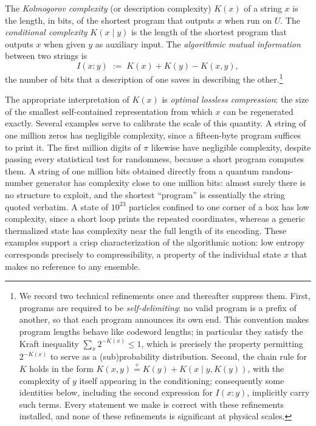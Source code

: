 \documentclass[11pt]{article}
\newcommand{\peq}{\mathrel{\stackrel{+}{=}}}
\begin{document}
\begin{definition}
\label{def:K}
The \emph{Kolmogorov complexity} (or description complexity) $K(x)$ of a string $x$ is the length, in bits, of the shortest program that outputs $x$ when run on $U$. The \emph{conditional complexity} $K(x \mid y)$ is the length of the shortest program that outputs $x$ when given $y$ as auxiliary input. The \emph{algorithmic mutual information} between two strings is
\[
I(x : y) \;:=\; K(x) + K(y) - K(x, y),
\]
the number of bits that a description of one saves in describing the other.\footnote{We record two technical refinements once and thereafter suppress them. First, programs are required to be \emph{self-delimiting}: no valid program is a prefix of another, so that each program announces its own end. This convention makes program lengths behave like codeword lengths; in particular they satisfy the Kraft inequality $\sum_x 2^{-K(x)} \le 1$, which is precisely the property permitting $2^{-K(x)}$ to serve as a (sub)probability distribution. Second, the chain rule for $K$ holds in the form $K(x,y) \peq K(y) + K(x \mid y, K(y))$, with the complexity of $y$ itself appearing in the conditioning; consequently some identities below, including the second expression for $I(x:y)$, implicitly carry such terms. Every statement we make is correct with these refinements installed, and none of these refinements is significant at physical scales.}
\end{definition}

The appropriate interpretation of $K(x)$ is \emph{optimal lossless compression}: the size of the smallest self-contained representation from which $x$ can be regenerated exactly. Several examples serve to calibrate the scale of this quantity. A string of one million zeros has negligible complexity, since a fifteen-byte program suffices to print it. The first million digits of $\pi$ likewise have negligible complexity, despite passing every statistical test for randomness, because a short program computes them. A string of one million bits obtained directly from a quantum random-number generator has complexity close to one million bits: almost surely there is no structure to exploit, and the shortest ``program'' is essentially the string quoted verbatim. A state of $10^{23}$ particles confined to one corner of a box has low complexity, since a short loop prints the repeated coordinates, whereas a generic thermalized state has complexity near the full length of its encoding. These examples support a crisp characterization of the algorithmic notion: low entropy corresponds precisely to compressibility, a property of the individual state $x$ that makes no reference to any ensemble.
\end{document}
